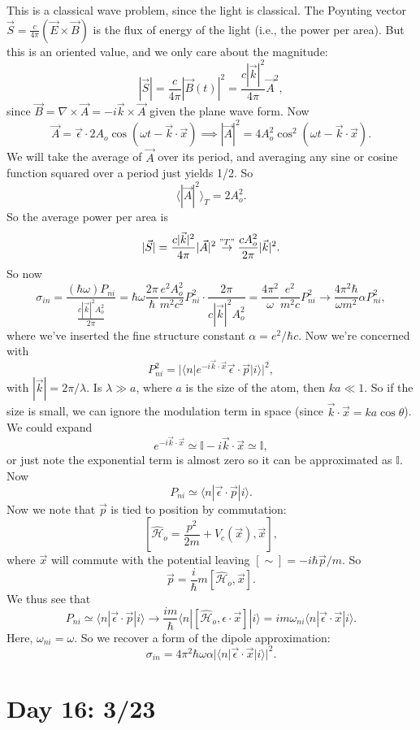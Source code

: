 \documentclass[fontsize=12pt]{scrartcl}
\newcommand{\bb}[1]{\mathbb{#1}}
\newcommand{\Id}{\bb{I}}
\newcommand{\la}{\langle}
\newcommand{\ra}{\rangle}
\newcommand{\Ham}{\hat{\mathcal{H}}}
\begin{document}
This is a classical wave problem, since the light is classical. The Poynting vector $\vec{S}=\frac{c}{4\pi}(\vec{E}\times\vec{B})$ is the flux of energy of the light (i.e., the power per area). But this is an oriented value, and we only care about the magnitude: $$|\vec{S}|=\frac{c}{4\pi}|\vec{B}(t)|^2 = \frac{c|\vec{k}|^2}{4\pi}\vec{A}^2,$$ since $\vec{B}=\nabla\times\vec{A}=-i\vec{k}\times\vec{A}$ given the plane wave form. Now $$\vec{A}=\vec{\epsilon}\cdot 2A_o\cos(\omega t-\vec{k}\cdot\vec{x})\implies |\vec{A}|^2 = 4A_o^2\cos^2(\omega t-\vec{k}\cdot\vec{x}).$$ We will take the average of $\vec{A}$ over its period, and averaging any sine or cosine function squared over a period just yields 1/2. So $$\la |\vec{A}|^2\ra_T=2A_o^2.$$ So the average power per area is $$|\vec{S}|=\frac{c|\vec{k}|^2}{4\pi}|\vec{A}|^2\overset{"T"}{\to}\frac{cA_o^2}{2\pi}|\vec{k}|^2.$$ So now $$\sigma_{in}=\frac{(\hbar\omega)P_{ni}}{\frac{c|\vec{k}|^2A_o^2}{2\pi}} = \hbar\omega\frac{2\pi}{\hbar} \frac{e^2A_o^2}{m^2c^2}P_{ni}^2\cdot\frac{2\pi}{c|\vec{k}|^2A_o^2}=\frac{4\pi^2}{\omega}\frac{e^2}{m^2c}P_{ni}^2\to \frac{4\pi^2\hbar}{\omega m^2}\alpha P_{ni}^2,$$ where we've inserted the fine structure constant $\alpha=e^2/\hbar c.$ Now we're concerned with $$P_{ni}^2 = |\la n | e^{-i\vec{k}\cdot\vec{x}}\vec{\epsilon}\cdot\vec{p}|i\ra|^2,$$ with $|\vec{k}| = 2\pi/\lambda$. Is $\lambda \gg a$, where $a$ is the size of the atom, then $ka\ll 1$. So if the size is small, we can ignore the modulation term in space (since $\vec{k}\cdot\vec{x}=ka\cos\theta$). We could expand $$e^{-i\vec{k}\cdot\vec{x}}\simeq \Id - i\vec{k}\cdot\vec{x}\simeq \Id,$$ or just note the exponential term is almost zero so it can be approximated as $\Id$. Now $$P_{ni}\simeq \la n |\vec{\epsilon}\cdot\vec{p}|i\ra.$$ Now we note that $\vec{p}$ is tied to position by commutation: $$\left[\Ham_o=\frac{p^2}{2m}+V_c(\vec{x}), \vec{x}\right],$$  where $\vec{x}$ will commute with the potential leaving $[\sim]=-i\hbar \vec{p}/m.$ So $$\vec{p}=\frac{i}{\hbar}m [\Ham_o, \vec{x}].$$ We thus see that $$P_{ni}\simeq \la n |\vec{\epsilon}\cdot\vec{p}|i\ra \to \frac{im}{\hbar}\la n |[\Ham_o, \epsilon\cdot\vec{x}]|i\ra = im\omega_{ni}\la n|\vec{\epsilon}\cdot\vec{x}|i\ra.$$ Here, $\omega_{ni}=\omega$. So we recover a form of the dipole approximation: $$\sigma_{in}=4\pi^2\hbar\omega\alpha|\la n |\vec{\epsilon}\cdot\vec{x}|i\ra|^2.$$

\section{Day 16: 3/23}
\end{document}
